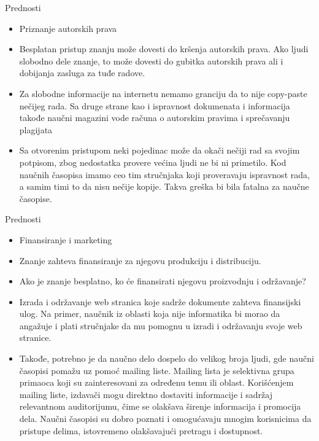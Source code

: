\documentclass[11pt]{beamer}
\begin{document}
\begin{frame}{Prednosti}
        \begin{itemize}
           \item Priznanje autorskih prava
           \item Besplatan pristup znanju može dovesti do kršenja autorskih prava. Ako ljudi slobodno dele znanje, to može dovesti do gubitka autorskih prava ali i dobijanja zasluga za tuđe radove.
             \item Za slobodne informacije na internetu nemamo granciju da to nije copy-paste nečijeg rada. Sa druge strane kao i ispravnost dokumenata i informacija takođe naučni magazini vode računa o autorskim pravima i sprečavanju plagijata

        \item Sa otvorenim pristupom neki pojedinac može da okači nečiji rad sa svojim potpisom, zbog nedostatka provere većina ljudi ne bi ni primetilo. Kod naučnih časopisa imamo ceo tim stručnjaka koji proveravaju ispravnost rada, a samim timi to da nisu nečije kopije. Takva greška bi bila fatalna za naučne časopise.


        \end{itemize}
       
\end{frame}

\begin{frame}{Prednosti}
        \begin{itemize}
            \item  Finansiranje i marketing
            \item Znanje zahteva finansiranje za njegovu produkciju i distribuciju.
            \item  Ako je znanje besplatno, ko će finansirati njegovu proizvodnju i održavanje?
            \item Izrada i održavanje web stranica koje sadrže dokumente zahteva finansijski ulog. Na primer, naučnik iz oblasti koja nije informatika bi morao da angažuje i plati stručnjake da mu pomognu u izradi i održavanju svoje web stranice.
            \item Takođe, potrebno je da naučno delo dospelo do velikog broja ljudi, gde naučni časopisi pomažu uz pomoć mailing liste. Mailing lista je selektivna grupa primaoca koji su zainteresovani za određenu temu ili oblast. Korišćenjem mailing liste, izdavači mogu direktno dostaviti informacije i sadržaj relevantnom auditorijumu, čime se olakšava širenje informacija i promocija dela. Naučni časopisi su dobro poznati i omogućavaju mnogim korisnicima da pristupe delima, istovremeno olakšavajući pretragu i dostupnost.
        \end{itemize}
       
\end{frame}
\end{document}
